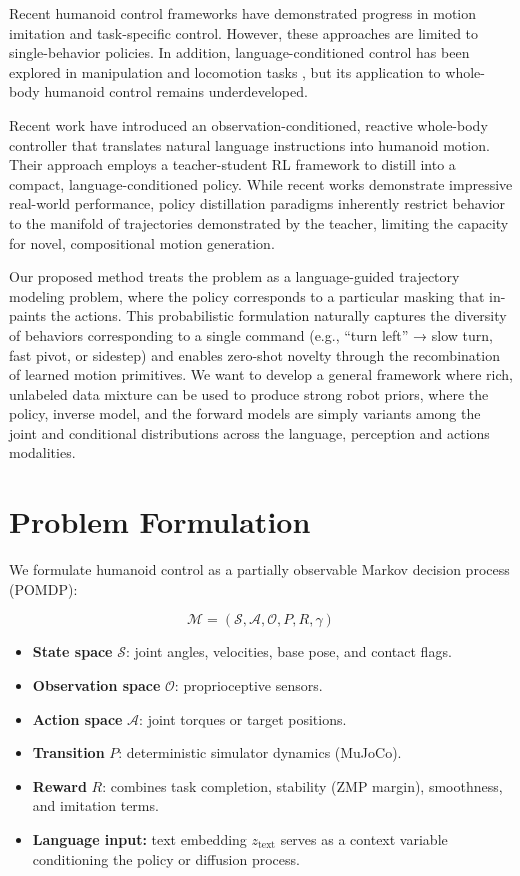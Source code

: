 \documentclass{article}
\begin{document}
Recent humanoid control frameworks \cite{liao2025beyondmimicmotiontrackingversatile} \cite{ji2024exbody2} have demonstrated progress in motion imitation and task-specific control. However, these approaches are limited to single-behavior policies. In addition, language-conditioned control has been explored in manipulation and locomotion tasks \cite{DBLP:journals/corr/abs-2109-01115}, but its application to whole-body humanoid control remains underdeveloped.

Recent work \cite{shao2025langwbclanguagedirectedhumanoidwholebody} have introduced an observation-conditioned, reactive whole-body controller that translates natural language instructions into humanoid motion. Their approach employs a teacher-student RL framework to distill into a compact, language-conditioned policy. While recent works demonstrate impressive real-world performance, policy distillation paradigms inherently restrict behavior to the manifold of trajectories demonstrated by the teacher, limiting the capacity for novel, compositional motion generation.

Our proposed method treats the problem as a language-guided trajectory modeling problem, where the policy corresponds to a particular masking that in-paints the actions. This probabilistic formulation naturally captures the diversity of behaviors corresponding to a single command (e.g., “turn left” → slow turn, fast pivot, or sidestep) and enables zero-shot novelty through the recombination of learned motion primitives. We want to develop a general framework where rich, unlabeled data mixture can be used to produce strong robot priors, where the policy, inverse model, and the forward models are simply variants among the joint and conditional distributions across the language, perception and actions modalities.

\section{Problem Formulation}
\label{sec:formulation}

We formulate humanoid control as a partially observable Markov decision process (POMDP):

\[
\mathcal{M} = (\mathcal{S}, \mathcal{A}, \mathcal{O}, P, R, \gamma)
\]

\begin{itemize}
    \item \textbf{State space} $\mathcal{S}$: joint angles, velocities, base pose, and contact flags.
    \item \textbf{Observation space} $\mathcal{O}$: proprioceptive sensors.
    \item \textbf{Action space} $\mathcal{A}$: joint torques or target positions.
    \item \textbf{Transition} $P$: deterministic simulator dynamics (MuJoCo).
    \item \textbf{Reward} $R$: combines task completion, stability (ZMP margin), smoothness, and imitation terms.
    \item \textbf{Language input:} text embedding $z_{\text{text}}$ serves as a context variable conditioning the policy or diffusion process.
\end{itemize}
\end{document}
